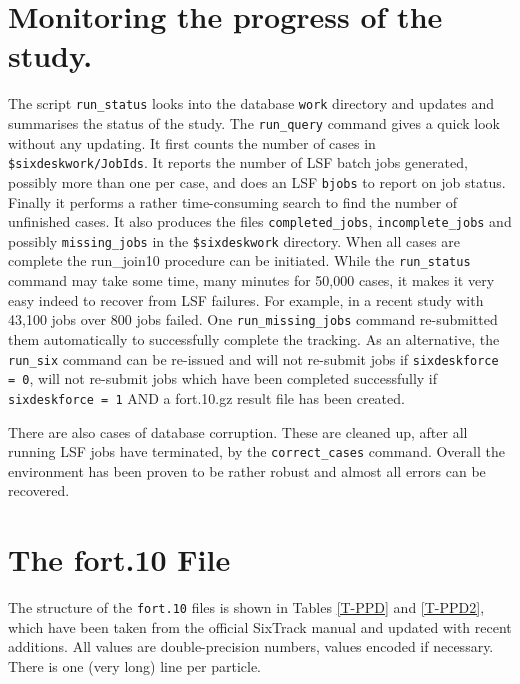 \documentclass{cernatsnote}    %
\begin{document}
\section{Monitoring the progress of the study.}
\label{sec:status}
The script {\tt run\_status} looks into the database {\tt work} directory and updates and summarises
the status of the study. The {\tt run\_query} command gives a quick look without
any updating. It first counts the number of cases in {\tt \$sixdeskwork/JobIds}.
It reports the number of LSF batch jobs generated, possibly
more than one per case, and does an LSF {\tt bjobs} to report on job status.
Finally it performs a rather time-consuming search to find the number of unfinished cases.
It also produces the files {\tt completed\_jobs}, {\tt incomplete\_jobs}
and possibly {\tt missing\_jobs} in the
{\tt \$sixdeskwork} directory.  When all cases are complete the {run\_join10} procedure can
be initiated. While the {\tt run\_status} command may take some time, many minutes for
50,000 cases, it makes it very easy indeed to recover from LSF failures. For example, in
a recent study with 43,100 jobs over 800 jobs failed. One {\tt run\_missing\_jobs}
command re-submitted them automatically to successfully complete the tracking.  
As an alternative, the {\tt run\_six} command can be re-issued and will not re-submit
jobs if {\tt sixdeskforce = 0}, will not re-submit jobs which have been completed successfully
if {\tt sixdeskforce = 1} AND a fort.10.gz result file has been created.

There are also cases of database corruption. These are cleaned up, after all running LSF jobs
have terminated, by the {\tt correct\_cases} command. Overall the environment has
been proven to be rather robust and almost all errors can be recovered.

\section{The fort.10 File}
\label{sec:fort10}
The structure of the {\tt fort.10} files is shown in Tables
\ref{T-PPD} and \ref{T-PPD2}, which have been taken from the official
SixTrack manual \cite{SixTrack} and updated with recent additions.
All values are double-precision numbers, values encoded if necessary.
There is one (very long) line per particle.

 \setcounter{dst}{0}
\end{document}
